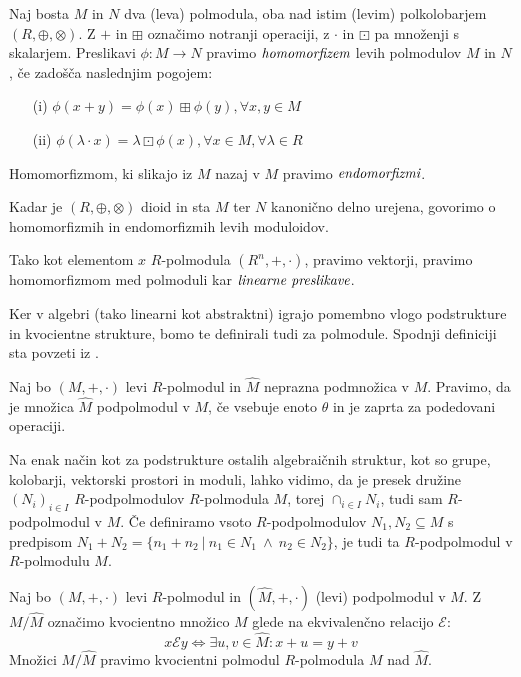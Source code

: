 \documentclass[mat1]{fmfdelo}
\newcommand{\pojem}[1]{\ensuremath{\emph{#1}}}
\newcommand{\map}[3]{\ensuremath{{#1}:{#2}\rightarrow{#3}}}
\begin{document}
\begin{definicija}
	Naj bosta $M$ in $N$ dva (leva) polmodula, oba nad istim (levim) polkolobarjem $(R, \oplus, \otimes)$. Z $+$ in $\boxplus$ označimo notranji operaciji, z $\cdot$ in $\boxdot$ pa množenji s skalarjem. Preslikavi \map{\phi}{M}{N} pravimo \pojem{homomorfizem} levih polmodulov $M$ in $N$, če zadošča naslednjim pogojem: \begin{enumerate}
		\item[(i)] $\phi(x + y) = \phi(x)\boxplus\phi(y), \forall x, y\in M$
		\item[(ii)] $\phi(\lambda\cdot x) = \lambda \boxdot \phi(x), \forall x\in M, \forall \lambda\in R$
	\end{enumerate}
Homomorfizmom, ki slikajo iz $M$ nazaj v $M$ pravimo \pojem{endomorfizmi}.

Kadar je $(R, \oplus, \otimes)$ dioid in sta $M$ ter $N$ kanonično delno urejena, govorimo o homomorfizmih in endomorfizmih levih moduloidov.
\end{definicija}

\begin{opomba}
	Tako kot elementom $x$ $R$-polmodula $(R^n, +, \cdot)$, pravimo vektorji, pravimo homomorfizmom med polmoduli kar \pojem{linearne preslikave}.
\end{opomba}

Ker v algebri (tako linearni kot abstraktni) igrajo pomembno vlogo podstrukture in kvocientne strukture, bomo te definirali tudi za polmodule. Spodnji definiciji sta povzeti iz \cite{bib:Gondran}.

\begin{definicija}
	Naj bo $(M, +, \cdot)$ levi $R$-polmodul in $\widehat{M}$ neprazna podmnožica v $M$. Pravimo, da je množica $\widehat{M}$ podpolmodul v $M$, če vsebuje enoto $\theta$ in je zaprta za podedovani operaciji.
\end{definicija}

Na enak način kot za podstrukture ostalih algebraičnih struktur, kot so grupe, kolobarji, vektorski prostori in moduli, lahko vidimo, da je presek družine $(N_i)_{i\in I}$ $R$-podpolmodulov $R$-polmodula $M$, torej $\cap_{i\in I}N_i$, tudi sam $R$-podpolmodul v $M$. Če definiramo vsoto $R$-podpolmodulov $N_1,N_2\subseteq M$ s predpisom $N_1 + N_2 =\{n_1 + n_2~|~n_1\in N_1~\land~n_2\in N_2\}$, je tudi ta $R$-podpolmodul v $R$-polmodulu $M$.

\begin{definicija}
	Naj bo $(M, +, \cdot)$ levi $R$-polmodul in $(\widehat{M}, +, \cdot)$ (levi) podpolmodul v $M$. Z $M/ \widehat{M}$ označimo kvocientno množico $M$ glede na ekvivalenčno relacijo $\mathcal{E}$: $$x\mathcal{E}y \iff \exists u, v\in\widehat{M}: x + u = y + v$$ Množici $M/\widehat{M}$ pravimo kvocientni polmodul $R$-polmodula $M$ nad $\widehat{M}$.
\end{definicija}
\end{document}
